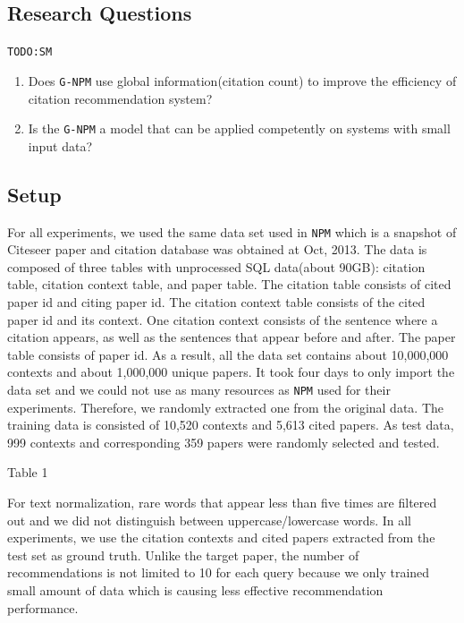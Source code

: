 \documentclass{llncs}
\newcommand{\name}{\texttt{G-NPM}\xspace}
\newcommand{\npm}{\texttt{NPM}\xspace}
\newcommand{\todo}[1]{\texttt{\color{red}TODO:#1}}
\begin{document}
\subsection{Research Questions}
\todo{SM}

\begin{enumerate}
\item Does \name use global information(citation count) to improve the efficiency of citation recommendation system?
\item Is the \name a model that can be applied competently on systems with small input data?
\end{enumerate}

\subsection{Setup}
\label{sec:setup}
For all experiments, we used the same data set used in \npm which is a snapshot of Citeseer paper and citation database was obtained at Oct, 2013. The data is composed of three tables with unprocessed SQL data(about 90GB): citation table, citation context table, and paper table. The citation table consists of cited paper id and citing paper id. The citation context table consists of the cited paper id and its context. One citation context consists of the sentence where a citation appears, as well as the sentences that appear before and after. The paper table consists of paper id. As a result, all the data set contains about 10,000,000 contexts and about 1,000,000 unique papers.
It took four days to only import the data set and we could not use as many resources as \npm used for their experiments. Therefore, we randomly extracted one from the original data. The training data is consisted of 10,520 contexts and 5,613 cited papers. As test data, 999 contexts and corresponding 359 papers were randomly selected and tested.


Table 1

For text normalization, rare words that appear less than five times are filtered out and we did not distinguish between uppercase/lowercase words. In all experiments, we use the citation contexts and cited papers extracted from the test set as ground truth. Unlike the target paper, the number of recommendations is not limited to 10 for each query because we only trained small amount of data which is causing less effective recommendation performance.
\end{document}
